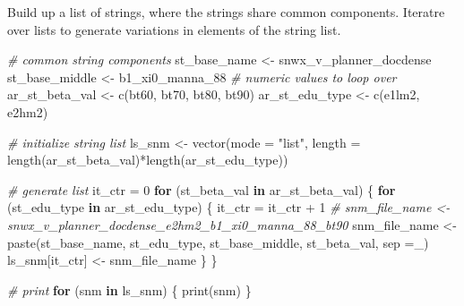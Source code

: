 \documentclass[
]{book}
\newenvironment{Shaded}{\begin{snugshade}}{\end{snugshade}}
\newcommand{\AttributeTok}[1]{\textcolor[rgb]{0.77,0.63,0.00}{#1}}
\newcommand{\CommentTok}[1]{\textcolor[rgb]{0.56,0.35,0.01}{\textit{#1}}}
\newcommand{\ControlFlowTok}[1]{\textcolor[rgb]{0.13,0.29,0.53}{\textbf{#1}}}
\newcommand{\DecValTok}[1]{\textcolor[rgb]{0.00,0.00,0.81}{#1}}
\newcommand{\FunctionTok}[1]{\textcolor[rgb]{0.00,0.00,0.00}{#1}}
\newcommand{\NormalTok}[1]{#1}
\newcommand{\OtherTok}[1]{\textcolor[rgb]{0.56,0.35,0.01}{#1}}
\newcommand{\SpecialCharTok}[1]{\textcolor[rgb]{0.00,0.00,0.00}{#1}}
\newcommand{\StringTok}[1]{\textcolor[rgb]{0.31,0.60,0.02}{#1}}
\begin{document}
Build up a list of strings, where the strings share common components. Iteratre over lists to generate variations in elements of the string list.

\begin{Shaded}
\begin{Highlighting}[]
\CommentTok{\# common string components}
\NormalTok{st\_base\_name }\OtherTok{\textless{}{-}} \StringTok{\textquotesingle{}snwx\_v\_planner\_docdense\textquotesingle{}}
\NormalTok{st\_base\_middle }\OtherTok{\textless{}{-}} \StringTok{\textquotesingle{}b1\_xi0\_manna\_88\textquotesingle{}}
\CommentTok{\# numeric values to loop over}
\NormalTok{ar\_st\_beta\_val }\OtherTok{\textless{}{-}} \FunctionTok{c}\NormalTok{(}\StringTok{\textquotesingle{}bt60\textquotesingle{}}\NormalTok{, }\StringTok{\textquotesingle{}bt70\textquotesingle{}}\NormalTok{, }\StringTok{\textquotesingle{}bt80\textquotesingle{}}\NormalTok{, }\StringTok{\textquotesingle{}bt90\textquotesingle{}}\NormalTok{)}
\NormalTok{ar\_st\_edu\_type }\OtherTok{\textless{}{-}} \FunctionTok{c}\NormalTok{(}\StringTok{\textquotesingle{}e1lm2\textquotesingle{}}\NormalTok{, }\StringTok{\textquotesingle{}e2hm2\textquotesingle{}}\NormalTok{)}

\CommentTok{\# initialize string list}
\NormalTok{ls\_snm }\OtherTok{\textless{}{-}} \FunctionTok{vector}\NormalTok{(}\AttributeTok{mode =} \StringTok{"list"}\NormalTok{, }\AttributeTok{length =} \FunctionTok{length}\NormalTok{(ar\_st\_beta\_val)}\SpecialCharTok{*}\FunctionTok{length}\NormalTok{(ar\_st\_edu\_type))}

\CommentTok{\# generate list }
\NormalTok{it\_ctr }\OtherTok{=} \DecValTok{0}
\ControlFlowTok{for}\NormalTok{ (st\_beta\_val }\ControlFlowTok{in}\NormalTok{ ar\_st\_beta\_val) \{}
  \ControlFlowTok{for}\NormalTok{ (st\_edu\_type }\ControlFlowTok{in}\NormalTok{ ar\_st\_edu\_type) \{}
\NormalTok{    it\_ctr }\OtherTok{=}\NormalTok{ it\_ctr }\SpecialCharTok{+} \DecValTok{1}
    \CommentTok{\# snm\_file\_name \textless{}{-} \textquotesingle{}snwx\_v\_planner\_docdense\_e2hm2\_b1\_xi0\_manna\_88\_bt90\textquotesingle{}}
\NormalTok{    snm\_file\_name }\OtherTok{\textless{}{-}} \FunctionTok{paste}\NormalTok{(st\_base\_name, st\_edu\_type, st\_base\_middle, st\_beta\_val, }\AttributeTok{sep =}\StringTok{\textquotesingle{}\_\textquotesingle{}}\NormalTok{)}
\NormalTok{    ls\_snm[it\_ctr] }\OtherTok{\textless{}{-}}\NormalTok{ snm\_file\_name}
\NormalTok{  \}}
\NormalTok{\}}

\CommentTok{\# print}
\ControlFlowTok{for}\NormalTok{ (snm }\ControlFlowTok{in}\NormalTok{ ls\_snm) \{}
  \FunctionTok{print}\NormalTok{(snm)}
\NormalTok{\}}
\end{Highlighting}
\end{Shaded}
\end{document}
